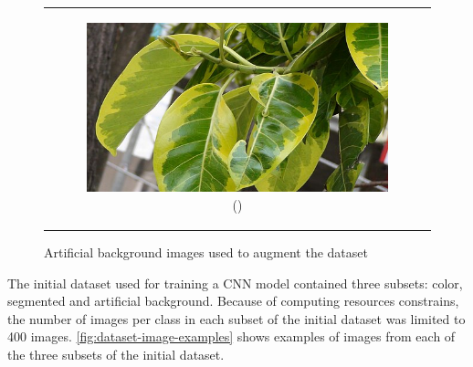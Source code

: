 \documentclass{BachelorBUI}
\begin{document}
\begin{figure}[!h]
\begin{tabular}{c}
\begin{subfigure}{0.30\textwidth}
                    \includegraphics[width=\textwidth]{10_artificial_background.jpg}
                    \caption{\centering (\cite{10_artificial_background:2009})}
                \end{subfigure} \\
            \end{tabular}
            \caption{\centering Artificial background images used to augment the dataset}
            \label{fig:artificial-backgrounds}
        \end{figure}

        The initial dataset used for training a CNN model contained three subsets: color, segmented and artificial background. Because of computing resources constrains, the number of images per class in each subset of the initial dataset was limited to 400 images. \autoref{fig:dataset-image-examples} shows examples of images from each of the three subsets of the initial dataset.
\end{document}

